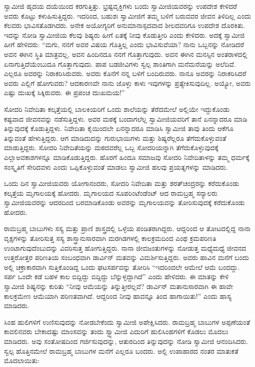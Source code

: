  ಸ್ವಾಮೀಜಿ ಹೃದಯ ದಯೆಯಿಂದ ಕರಗುತ್ತಿತ್ತು. ಭ್ರಷ್ಟವೃಕ್ತಿಗಳು ಬಂದು ಸ್ವಾಮೀಜಿಯವರನ್ನು ಉಪದೇಶ ಕೇಳಿದರೆ ಅವರು ಕೊಟ್ಟು ಕಳುಹಿಸುತ್ತಿದ್ದರು. ಇದರಿಂದ, ಬಹುಶಃ ಸ್ವಾಮೀಜಿಗೆ ತಮ್ಮ ಬಳಿಗೆ ಬರುವವರ ಜೀವನ ತಿಳಿದಿಲ್ಲ ಎಂದು ಕೆಲವರು ಭಾವಿಸತೊಡಗಿದರು. ಅನೇಕ ಅಯೋಗ್ಯರಿಗೆ ಅನುಮಾನಾಸ್ಪದವಾದ ಶೀಲದವರಿಗೂ ಉಪದೇಶ ದೊರಕಿತು. ಇದನ್ನು ನೋಡಿ ಸ್ವಾಮೀಜಿಯ ಕೆಲವು ಶಿಷ್ಯರು ಹೀಗೆ ಏತಕ್ಕೆ ನೀವು ಕೊಡುತ್ತೀರಿ ಎಂದು ಕೇಳಿದರು. ಅದಕ್ಕೆ ಸ್ವಾಮೀಜಿ ಹೀಗೆ ಹೇಳಿದರು: “ಮಗು, ನನಗೆ ಅವರ ವಿಷಯ ಗೊತ್ತಿಲ್ಲ ಎಂದು ಭಾವಿಸುವೆಯಾ? ನಾನು ಒಬ್ಬನನ್ನು ನೋಡಿದರೆ ಅವನ ಈಗಿನ ಸ್ಥಿತಿ ಮಾತ್ರವಲ್ಲ, ಅವನ ಹಿಂದಿನದೂ ನನಗೆ ಗೊತ್ತಾಗುವುದು. ಅವನ ಈಗಿನ ಮನಸ್ಸಿನ ಅಂತರಾಳದಲ್ಲಿ ಏನಾಗುತ್ತಿದೆಯೆಂಬುದೂ ಗೊತ್ತಾಗುವುದು. ಪಾಪ ಬಡಜೀವಿಗಳು ಸ್ವಲ್ಪ ಶಾಂತಿಗಾಗಿ ಮನೆಮನೆಯನ್ನು ಅಲೆದಿವೆ. ಎಲ್ಲರೂ ಅವರನ್ನು ನಿರಾಕರಿಸಿರುವರು. ಅವರು ಕೊನೆಗೆ ನನ್ನ ಬಳಿಗೆ ಬಂದಿರುವರು. ನಾನೂ ಅವರನ್ನು ನಿರಾಕರಿಸಿದರೆ ಅವರು ಎಲ್ಲಿಗೆ ಹೋಗುವರು? ಆದಕಾರಣವೇ ನಾನು ಜೊಳ್ಳು ಕಾಳು ಇವುಗಳನ್ನು ಪ್ರತ್ಯೇಕಿಸುವುದಿಲ್ಲ. ಅಯ್ಯೋ, ಅವರು ಎಷ್ಟು ದುಃಖಕ್ಕೆ ಸಿಕ್ಕಿರುವರು. ಈ ಪ್ರಪಂಚ ದುಃಖಮಯ!” 

 ಸೋದರಿ ನಿವೇದಿತಾ ಕಲ್ಕತ್ತೆಯಲ್ಲಿ ಬಾಲಕಿಯರಿಗೆ ಒಂದು ಶಾಲೆಯನ್ನು ತೆರೆದಮೇಲೆ ಅಲ್ಲಿಯೇ ಇದ್ದುಕೊಂಡು ಕಷ್ಟವಾದ ಜೀವನವನ್ನು ನಡೆಸುತ್ತಿದ್ದಳು. ಅವರ ಮಠಕ್ಕೆ ಬಂದಾಗಲೆಲ್ಲ ಸ್ವಾಮೀಜಿಯವರಿಗೆ ತಾನೆ ಏನನ್ನಾದರೂ ಮಾಡಿ ತಿನ್ನುವುದಕ್ಕೆ ಕೊಡುತ್ತಿದ್ದಳು. ನಿವೇದಿತಾ ಕೈಯಿಂದಲೇ ಏನನ್ನಾದರೂ ಮಾಡಿಸಿ ಸ್ವಾಮೀಜಿ ತಾವು ತಿಂದು ಆಕೆಗೂ ತಿನ್ನುವಂತೆ ಹೇಳುತ್ತಿದ್ದರು. ಆಗ ಮಾಡಿದುದನ್ನು ಗುರುಭಾಯಿಗಳು ಮತ್ತು ಶಿಷ್ಯರೆಲ್ಲರೂ ತೆಗೆದುಕೊಳ್ಳುವಂತೆ ಮಾಡುತ್ತಿದ್ದರು. ಸೋದರಿ ನಿವೇದಿತೆಯನ್ನು ಮಠದವರೆಲ್ಲ ಒಬ್ಬ ಸೋದರಿಯನ್ನಾಗಿ ತೆಗೆದುಕೊಳ್ಳುವುದಕ್ಕೆ ಎಲ್ಲಾ\break ಅವಕಾಶಗಳನ್ನೂ ಮಾಡಿಕೊಡುತ್ತಿದ್ದರು. ಹೊರಗೆ ಹಿಂದೂ‌ ಸಮಾಜವು ಸೋದರಿ ನಿವೇದಿತಾಳನ್ನು ತಮ್ಮ ಧರ್ಮಕ್ಕೆ ಸಂಸ್ಕೃತಿಗೆ ಸೇರಿದವಳು ಎಂದು ಒಪ್ಪಿಕೊಳ್ಳುವಂತೆ ಮಾಡಲು ಸ್ವಾಮೀಜಿ ಹಲವು ಪ್ರಯತ್ನಗಳನ್ನು ಮಾಡಿದರು. 

 ಒಂದು ದಿನ ಸ್ವಾಮೀಜಿಯವರು ಯೋಗಾನಂದರು, ಸೋದರಿ ನಿವೇದಿತಾ ಮತ್ತು ಶರತ್‍ಚಂದ್ರರನ್ನು ಕರೆದುಕೊಂಡು ಕಲ್ಕತ್ತೆಯ ಮೃಗಾಲಯಕ್ಕೆ ಹೋದರು. ಮೃಗಾಲಯದ ಸೂಪರಿಂಟೆಂಡೆಂಟ್ ಆದ ರಾಮಬ್ರಹ್ಮ ಸನ್ಯಾಲರು ಸ್ವಾಮೀಜಿಯವರನ್ನು ಆದರದಿಂದ ಬರಮಾಡಿಕೊಂಡು ಅವರನ್ನು ಮೃಗಾಲಯವನ್ನು ತೋರಿಸುವುದಕ್ಕೆ ಕರೆದುಕೊಂಡು ಹೋದರು. 

 ರಾಮಬ್ರಹ್ಮ ಬಾಬುಗಳು ಸಸ್ಯ ಮತ್ತು ಪ್ರಾಣಿ ಶಾಸ್ತ್ರದಲ್ಲಿ ಒಳ್ಳೆಯ ಪಂಡಿತರಾಗಿದ್ದರು. ಆದ್ದರಿಂದ ಆ ತೋಟದಲ್ಲಿದ್ದ ನಾನಾ ವೃಕ್ಷಗಳನ್ನು ತೋರಿಸುತ್ತ ಸಸ್ಯ ಶಾಸ್ತ್ರಾನುಸಾರವಾಗಿ ಮರಗಿಡಗಳಲ್ಲಿ ಕಾಲಕ್ರಮದಿಂದ ಎಂಥ ಕ್ರಮಪರಿಣತಿ ಉಂಟಾಗುವುದೆಂಬುದನ್ನು ವಿವರಿಸುತ್ತ ಹೋಗುತ್ತಿದ್ದರು. ನಾನಾ ಜೀವಜಂತುಗಳನ್ನು ನೋಡುತ್ತ ಮಧ್ಯೆಮಧ್ಯೆ ಜೀವನದ ಉತ್ತರೋತ್ತರ ಪರಿಣತಿಯ ಸಂಬಂಧವಾಗಿ ಡಾರ್ವಿನ್ ಮತವನ್ನು ವಿಮರ್ಶಿಸುತ್ತಿದ್ದರು. ಅವರು ಹಾವಿನ ಮನೆಗೆ ಬಂದು ಅಲ್ಲಿ ಚಕ್ರಾಕಾರವಾಗಿ ಸುತ್ತಿಕೊಂಡಿದ್ದ ಒಂದು ಘಟಸರ್ಪವನ್ನು ತೋರಿಸಿ “ಇದರಿಂದಲೇ ಆಮೇಲೆ ಆಮೆ ಬಂದದ್ದು. ಸರ್ಪ ಒಂದೇ ಕಡೆ ಬಹಳ ಕಾಲ ಬಿದ್ದಿದ್ದು ಬಿದ್ದಿದ್ದು ಬೆನ್ನುಳ್ಳದ್ದಾಗಿದೆ” ಎಂದು ಹೇಳಿದರು. ಈ ಮಾತನ್ನು ಕೇಳಿ ಸ್ವಾಮೀಜಿ ಶಿಷ್ಯನನ್ನು ಕುರಿತು “ನೀವು ಆಮೆಯನ್ನು ತಿನ್ನುತ್ತೀರಲ್ಲವೆ? ಡಾರ್ವಿನ್ ಮತಾನುಸಾರವಾಗಿ ಈ ಹಾವೇ ಕಾಲಕ್ರಮೇಣ ಆಮೆಯಾಗಿ ಪರಿಣತವಾಗಿದೆ. ಆದ್ದರಿಂದ ನೀವು ಹಾವನ್ನೂ ತಿಂದ ಹಾಗಾಯಿತು!” ಎಂದು ಹಾಸ್ಯ ಮಾಡಿದರು. 

 ಸಿಂಹ ಹುಲಿಗಳಿಗೆ ಉಣಿಸುವುದನ್ನು ನೋಡಬೇಕೆಂದು ಸ್ವಾಮೀಜಿ ಅಪೇಕ್ಷಿಸಿದರು. ರಾಮಬ್ರಹ್ಮ ಬಾಬುಗಳ ಅಪ್ಪಣೆಯಂತೆ ಕಾವಲಿನವರು ಬೇಕಾದಷ್ಟು ಮಾಂಸವನ್ನು ತಂದು ಸ್ವ್ವಾಮೀಜಿ ಎದುರಿಗೆ ಹುಲಿಸಿಂಹಗಳಿಗೆ ಕೊಡಲು ಮೊದಲು ಮಾಡಿದರು. ಅವು ಸಂತೋಷದಿಂದ ಗರ್ಜಿಸುವುದನ್ನು, ಆತುರದಿಂದ ತಿನ್ನುವುದನ್ನು ನೋಡಿ ಸ್ವಾಮೀಜಿ ಆನಂದಿಸಿದರು. ಸ್ವಲ್ಪ ಹೊತ್ತಿನಮೇಲೆ ರಾಮಬ್ರಹ್ಮ ಬಾಬುಗಳ ಮನೆಗೆ ಎಲ್ಲರೂ ಬಂದರು. ಅಲ್ಲಿ ಉಪಾಹಾರದ ನಂತರ ಮಾತುಕತೆ ಮೊದಲಾಯಿತು: 

